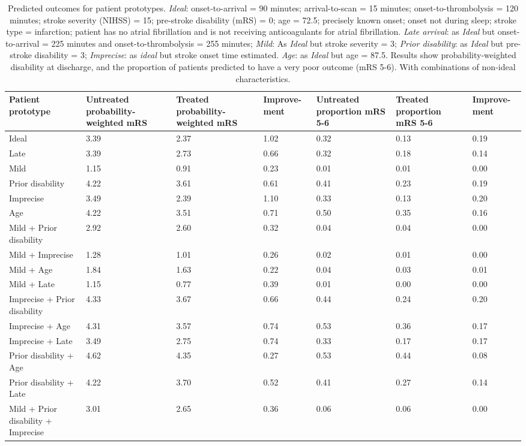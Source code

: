 \begin{minipage}{1\textwidth}
\small
\begin{longtable}{p{5.2cm} | p{1.6cm} p{1.6cm} p{1.5cm} | p{1.6cm} p{1.6cm} p{1.5cm}}
\caption{Predicted outcomes for patient prototypes. \textit{Ideal}: onset-to-arrival = 90 minutes; arrival-to-scan = 15 minutes; onset-to-thrombolysis = 120 minutes; stroke severity (NIHSS) = 15; pre-stroke disability (mRS) = 0; age = 72.5; precisely known onset; onset not during sleep; stroke type = infarction; patient has no atrial fibrillation and is not receiving anticoagulants for atrial fibrillation. \textit{Late arrival}: as \textit{Ideal} but onset-to-arrival = 225 minutes and onset-to-thrombolysis = 255 minutes; \textit{Mild}: As \textit{Ideal} but stroke severity = 3; \textit{Prior disability}: as \textit{Ideal} but pre-stroke disability = 3; \textit{Imprecise}: as \textit{ideal} but stroke onset time estimated. \textit{Age}: as \textit{Ideal} but age = 87.5. Results show probability-weighted disability at discharge, and the proportion of patients predicted to have a very poor outcome (mRS 5-6). With combinations of non-ideal characteristics.}\\
\label{tab:prototype_outcomes}
Patient prototype & Untreated probability-weighted mRS & Treated probability-weighted mRS & Improve-ment & Untreated proportion mRS 5-6 & Treated proportion mRS 5-6 & Improve-ment\\
\endhead
\midrule
Ideal & 3.39 & 2.37 & 1.02 & 0.32 & 0.13 & 0.19\\
Late & 3.39 & 2.73 & 0.66 & 0.32 & 0.18 & 0.14\\
Mild & 1.15 & 0.91 & 0.23 & 0.01 & 0.01 & 0.00\\
Prior disability & 4.22 & 3.61 & 0.61 & 0.41 & 0.23 & 0.19\\
Imprecise & 3.49 & 2.39 & 1.10 & 0.33 & 0.13 & 0.20\\
Age & 4.22 & 3.51 & 0.71 & 0.50 & 0.35 & 0.16\\
Mild + Prior disability & 2.92 & 2.60 & 0.32 & 0.04 & 0.04 & 0.00\\
Mild + Imprecise & 1.28 & 1.01 & 0.26 & 0.02 & 0.01 & 0.00\\
Mild + Age & 1.84 & 1.63 & 0.22 & 0.04 & 0.03 & 0.01\\
Mild + Late & 1.15 & 0.77 & 0.39 & 0.01 & 0.00 & 0.00\\
Imprecise + Prior disability & 4.33 & 3.67 & 0.66 & 0.44 & 0.24 & 0.20\\
Imprecise + Age & 4.31 & 3.57 & 0.74 & 0.53 & 0.36 & 0.17\\
Imprecise + Late & 3.49 & 2.75 & 0.74 & 0.33 & 0.17 & 0.17\\
Prior disability + Age & 4.62 & 4.35 & 0.27 & 0.53 & 0.44 & 0.08\\
Prior disability + Late & 4.22 & 3.70 & 0.52 & 0.41 & 0.27 & 0.14\\
Mild + Prior disability + Imprecise & 3.01 & 2.65 & 0.36 & 0.06 & 0.06 & 0.00\\


\end{longtable}
\normalsize
\end{minipage}

